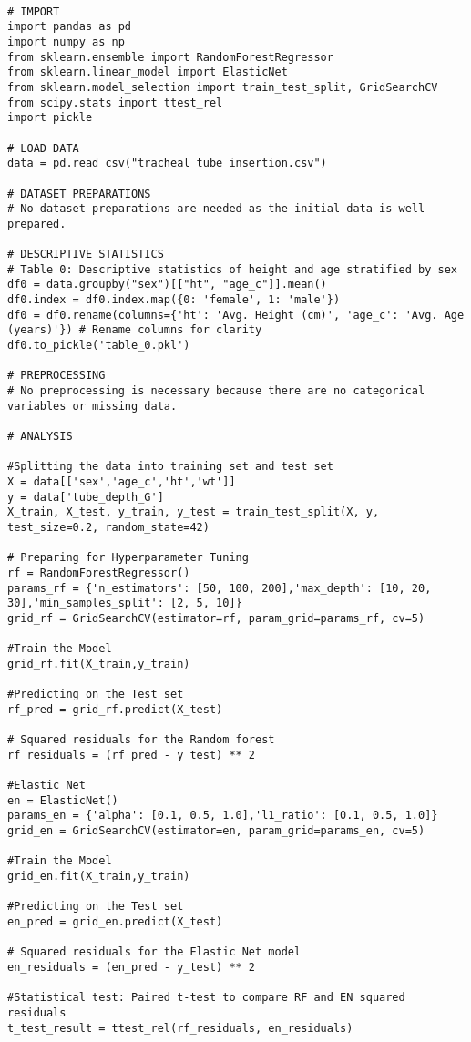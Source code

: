 \documentclass[11pt]{article}
\begin{document}
\begin{verbatim}

# IMPORT
import pandas as pd
import numpy as np
from sklearn.ensemble import RandomForestRegressor
from sklearn.linear_model import ElasticNet
from sklearn.model_selection import train_test_split, GridSearchCV
from scipy.stats import ttest_rel
import pickle

# LOAD DATA
data = pd.read_csv("tracheal_tube_insertion.csv")

# DATASET PREPARATIONS
# No dataset preparations are needed as the initial data is well-prepared.

# DESCRIPTIVE STATISTICS
# Table 0: Descriptive statistics of height and age stratified by sex
df0 = data.groupby("sex")[["ht", "age_c"]].mean()
df0.index = df0.index.map({0: 'female', 1: 'male'})
df0 = df0.rename(columns={'ht': 'Avg. Height (cm)', 'age_c': 'Avg. Age (years)'}) # Rename columns for clarity
df0.to_pickle('table_0.pkl')

# PREPROCESSING
# No preprocessing is necessary because there are no categorical variables or missing data.

# ANALYSIS

#Splitting the data into training set and test set
X = data[['sex','age_c','ht','wt']]
y = data['tube_depth_G']
X_train, X_test, y_train, y_test = train_test_split(X, y, test_size=0.2, random_state=42)

# Preparing for Hyperparameter Tuning
rf = RandomForestRegressor()
params_rf = {'n_estimators': [50, 100, 200],'max_depth': [10, 20, 30],'min_samples_split': [2, 5, 10]}
grid_rf = GridSearchCV(estimator=rf, param_grid=params_rf, cv=5)

#Train the Model
grid_rf.fit(X_train,y_train)

#Predicting on the Test set
rf_pred = grid_rf.predict(X_test)

# Squared residuals for the Random forest
rf_residuals = (rf_pred - y_test) ** 2

#Elastic Net
en = ElasticNet()
params_en = {'alpha': [0.1, 0.5, 1.0],'l1_ratio': [0.1, 0.5, 1.0]}
grid_en = GridSearchCV(estimator=en, param_grid=params_en, cv=5)

#Train the Model
grid_en.fit(X_train,y_train)

#Predicting on the Test set
en_pred = grid_en.predict(X_test)

# Squared residuals for the Elastic Net model
en_residuals = (en_pred - y_test) ** 2

#Statistical test: Paired t-test to compare RF and EN squared residuals
t_test_result = ttest_rel(rf_residuals, en_residuals)


\end{verbatim}
\end{document}
